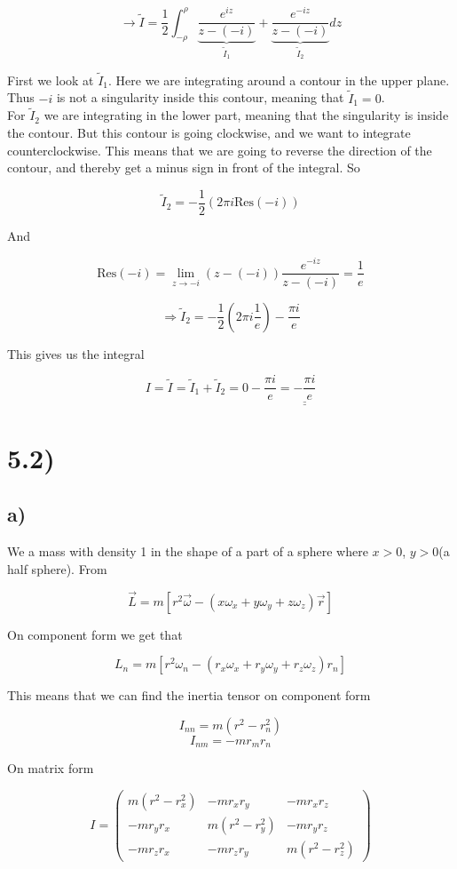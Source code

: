 \documentclass[a4paper,norsk, 10pt]{article}
\begin{document}
$$
\rightarrow \tilde{I} = \frac{1}{2}\int_{-\rho}^{\rho} \underbrace{\frac{e^{iz}}{z-(-i)}}_{\tilde{I}_1} + \underbrace{\frac{e^{-iz}}{z-(-i)}}_{\tilde{I}_2} dz
$$

First we look at $\tilde{I}_1$. Here we are integrating around a contour in the upper plane. Thus $-i$ is not a singularity inside this contour, meaning that $\tilde{I}_1 = 0$.\\

For $\tilde{I}_2$ we are integrating in the lower part, meaning that the singularity is inside the contour. But this contour is going clockwise, and we want to integrate counterclockwise. This means that we are going to reverse the direction of the contour, and thereby get a minus sign in front of the integral. So

$$
\tilde{I}_2 = -\frac{1}{2}(2\pi i \mathrm{Res}(-i))
$$

And

$$
\mathrm{Res}(-i) = \lim_{z \rightarrow -i} (z-(-i))\frac{e^{-iz}}{z-(-i)} = \frac{1}{e}
$$

$$
\Rightarrow \tilde{I}_2 = -\frac{1}{2}(2\pi i \frac{1}{e}) -\frac{\pi i}{e}
$$

This gives us the integral

$$
I = \tilde{I} = \tilde{I}_1 + \tilde{I}_2 = 0 -\frac{\pi i}{e} = \underline{\underline{-\frac{\pi i}{e}}}
$$

\section*{5.2)}
\subsection*{a)}
We a mass with density 1 in the shape of a part of a sphere where $x > 0$, $y > 0$(a half sphere). From

$$
\vec{L} = m[r^2\vec{\omega} -(x\omega_x + y\omega_y + z\omega_z)\vec{r}]
$$

On component form we get that

$$
L_n = m[r^2\omega_n-(r_x\omega_x + r_y\omega_y + r_z\omega_z)r_n]
$$

This means that we can find the inertia tensor on component form

$$
I_{nn} = m(r^2-r_n^2) 
$$
$$
I_{nm} = -mr_mr_n 
$$

On matrix form

$$
I =
\begin{pmatrix}
m(r^2-r_x^2) & -mr_xr_y  & -mr_xr_z \\
-mr_yr_x  & m(r^2-r_y^2) & -mr_yr_z \\
-mr_zr_x  & -mr_zr_y  & m(r^2-r_z^2)  
\end{pmatrix}
$$
\end{document}
